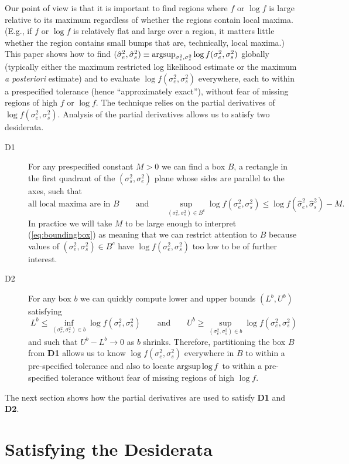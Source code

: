 \documentclass{report}
\newcommand{\RL}{f}
\newcommand{\logRL}{\log\RL}
\newcommand{\sigssq}{\sigma_s^2}
\newcommand{\sigesq}{\sigma_e^2}
\newcommand{\sshat}{\hat\sigma^2_e,\hat\sigma^2_s}
\newcommand{\logRLss}{\logRL(\sigesq,\sigssq)}
\newcommand{\argsup}{\operatornamewithlimits{argsup}}
\begin{document}
Our point of view is that it is important to find regions where $f$ or $\log f$ is large relative to its maximum regardless of whether the regions contain local maxima.  (E.g., if $f$ or $\log f$ is relatively flat and large over a region, it matters little whether the region contains small bumps that are, technically, local maxima.)  This paper shows how to find $(\sshat) \equiv \argsup_{\sigesq, \sigssq}\logRLss$ globally (typically either the maximum restricted log likelihood estimate or the maximum \textit{a posteriori} estimate) and to evaluate $\logRLss$ everywhere, each to within a prespecified tolerance (hence ``approximately exact''), without fear of missing regions of high $f$ or $\logRL$.  The technique relies on the partial derivatives of $\logRLss$.  Analysis of the partial derivatives allows us to satisfy two desiderata.
\begin{description}
\item[D1] For any prespecified constant $M>0$ we can find a box $B$, a rectangle in the first quadrant of the $(\sigssq, \sigesq)$ plane whose sides are parallel to the axes, such that
\begin{equation}
\label{eq:boundingbox}
	\text{all local maxima are in $B$} \qquad \text{and} \qquad \sup_{(\sigesq, \sigssq) \in B^c} \logRLss \le \logRL(\sshat) - M.
\end{equation}
In practice we will take $M$ to be large enough to interpret (\ref{eq:boundingbox}) as meaning that we can restrict attention to $B$ because values of $(\sigesq, \sigssq) \in B^c$ have $\logRLss$ too low to be of further interest.

\item[D2] For any box $b$ we can quickly compute lower and upper bounds $(L^b,U^b)$ satisfying
\begin{equation*}
  L^b \le \inf_{(\sigesq, \sigssq) \in b}\logRLss \qquad\text{and}\qquad
  U^b \ge \sup_{(\sigesq, \sigssq) \in b}\logRLss
\end{equation*}
and such that $U^b-L^b \rightarrow 0$ as $b$ shrinks.  Therefore, partitioning the box $B$ from \textbf{D1} allows us to know $\logRLss$ everywhere in $B$ to within a pre-specified tolerance and also to locate $\argsup\logRL$ to within a pre-specified tolerance without fear of missing regions of high $\logRL$.
\end{description}
The next section shows how the partial derivatives are used to satisfy \textbf{D1} and \textbf{D2}.

\section{Satisfying the Desiderata}
\end{document}
